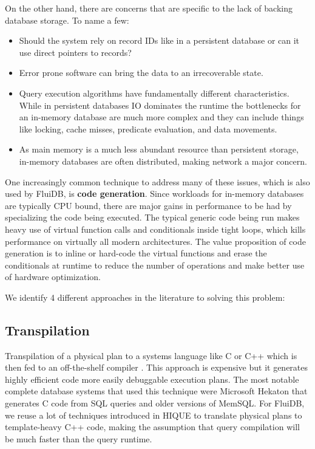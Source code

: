 On the other hand, there are concerns that are specific to the lack of
backing database storage. To name a few:

\begin{itemize}
\item Should the system rely on record IDs like in a persistent database
or can it use direct pointers to records?
\item Error prone software can bring the data to an irrecoverable state.
\item Query execution algorithms have fundamentally different
characteristics. While in persistent databases IO dominates the
runtime the bottlenecks for an in-memory database are much more
complex and they can include things like locking, cache misses,
predicate evaluation, and data movements.
\item As main memory is a much less abundant resource than persistent
storage, in-memory databases are often distributed, making network a
major concern.
\end{itemize}

One increasingly common technique to address many of these issues,
which is also used by FluiDB, is \textbf{code generation}. Since workloads
for in-memory databases are typically CPU bound, there are major gains
in performance to be had by specializing the code being executed. The
typical generic code being run makes heavy use of virtual function
calls and conditionals inside tight loops, which kills performance on
virtually all modern architectures. The value proposition of code
generation is to inline or hard-code the virtual functions and erase
the conditionals at runtime to reduce the number of operations and
make better use of hardware optimization.

We identify 4 different approaches in the literature to solving this
problem:

\subsection{Transpilation}

Transpilation of a physical plan to a systems language like C or C++
which is then fed to an off-the-shelf compiler
\cite{krikellasGeneratingCodeHolistic2010}. This approach is expensive
but it generates highly efficient code more easily debuggable
execution plans. The most notable complete database systems that used
this technique were Microsoft Hekaton that generates C code from SQL queries and
older versions of MemSQL. For FluiDB, we reuse a lot of techniques
introduced in HIQUE \cite{krikellasGeneratingCodeHolistic2010} to
translate physical plans to template-heavy C++ code, making the
assumption that query compilation will be much faster than the query
runtime.

